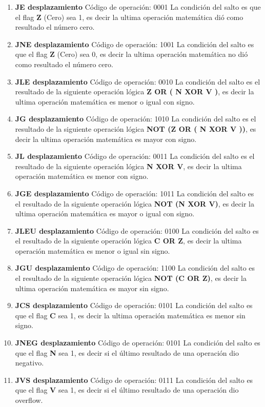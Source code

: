 \begin{enumerate}
\item \textbf{JE desplazamiento}
Código de operación: 0001
La condición del salto es que el flag \textbf{Z} (Cero) sea 1, es decir la ultima operación matemática dió como resultado el número cero.

\item \textbf{JNE desplazamiento}
Código de operación: 1001
La condición del salto es que el flag \textbf{Z} (Cero) sea 0, es decir la ultima operación matemática no dió como resultado el número cero.

\item \textbf{JLE desplazamiento}
Código de operación: 0010
La condición del salto es el resultado de la siguiente operación lógica \textbf{Z OR ( N XOR V )}, es decir la ultima operación matemática es menor o igual con signo.

\item \textbf{JG desplazamiento}
Código de operación: 1010
La condición del salto es el resultado de la siguiente operación lógica \textbf{NOT (Z OR ( N XOR V ))}, es decir la ultima operación matemática es mayor con signo.

\item \textbf{JL desplazamiento}
Código de operación: 0011
La condición del salto es el resultado de la siguiente operación lógica \textbf{N XOR V}, es decir la ultima operación matemática es menor con signo.

\item \textbf{JGE desplazamiento}
Código de operación: 1011
La condición del salto es el resultado de la siguiente operación lógica \textbf{NOT (N XOR V)}, es decir la ultima operación matemática es mayor o igual con signo.

\item \textbf{JLEU desplazamiento}
Código de operación: 0100
La condición del salto es el resultado de la siguiente operación lógica \textbf{C OR Z}, es decir la ultima operación matemática es menor o igual sin signo.

\item \textbf{JGU desplazamiento}
Código de operación: 1100
La condición del salto es el resultado de la siguiente operación lógica \textbf{NOT (C OR Z)}, es decir la ultima operación matemática es mayor sin signo.

\item \textbf{JCS desplazamiento}
Código de operación: 0101
La condición del salto es que el flag \textbf{C} sea 1, es decir la ultima operación matemática es menor sin signo.

\item \textbf{JNEG desplazamiento}
Código de operación: 0101
La condición del salto es que el flag \textbf{N} sea 1, es decir si el último resultado de una operación dio negativo.

\item \textbf{JVS desplazamiento}
Código de operación: 0111
La condición del salto es que el flag \textbf{V} sea 1, es decir si el último resultado de una operación dio overflow.

\end{enumerate}
